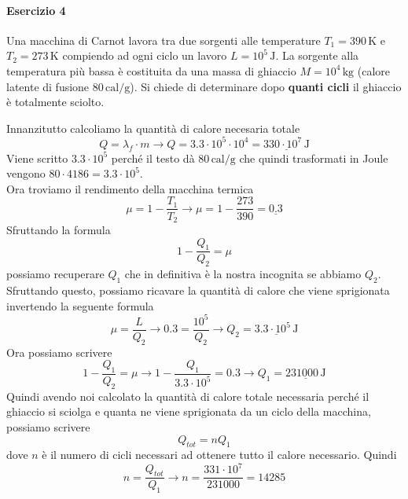 \paragraph{Esercizio 4}
Una macchina di Carnot lavora tra due sorgenti alle temperature $T_1 = 390\,\text{K}$ e 
$T_2 = 273\,\text{K}$ compiendo ad ogni ciclo un lavoro $L = 10^5\,\text{J}$. La sorgente alla
temperatura più bassa è costituita da una massa di ghiaccio $M = 10^4\,\text{kg}$ (calore latente
di fusione $80\,\text{cal/g}$). Si chiede di determinare dopo \textbf{quanti cicli} il ghiaccio è 
totalmente sciolto.
\divisor

Innanzitutto calcoliamo la quantità di calore necesaria totale
\begin{equation*}
  Q = \lambda_f\cdot m \rightarrow Q = 3.3\cdot10^5\cdot10^4 = \underline{330\cdot10^7\,\text{J}} 
\end{equation*}
Viene scritto $3.3\cdot10^5$ perché il testo dà $80\,\text{cal/g}$ che quindi trasformati in Joule
vengono $80\cdot4186 = 3.3\cdot10^5$.\\
Ora troviamo il rendimento della macchina termica
\begin{equation*}
  \mu = 1-\frac{T_1}{T_2} \rightarrow \mu = 1-\frac{273}{390}=\underline{0.3} 
\end{equation*}
Sfruttando la formula
\begin{equation*}
  1-\frac{Q_1}{Q_2} = \mu
\end{equation*}
possiamo recuperare $Q_1$ che in definitiva è la nostra incognita se abbiamo $Q_2$.\\
Sfruttando questo, possiamo ricavare la quantità di calore che viene sprigionata invertendo
la seguente formula
\begin{equation*}
  \mu = \frac{L}{Q_2} \rightarrow 0.3 = \frac{10^5}{Q_2} \rightarrow 
  Q_2 = \underline{3.3\cdot10^5\,\text{J}} 
\end{equation*}
Ora possiamo scrivere
\begin{equation*}
  1-\frac{Q_1}{Q_2} = \mu \rightarrow 1-\frac{Q_1}{3.3\cdot10^5}=0.3 \rightarrow Q_1 =
  \underline{231000\,\text{J}} 
\end{equation*}
Quindi avendo noi calcolato la quantità di calore totale necessaria perché il ghiaccio si sciolga
e quanta ne viene sprigionata da un ciclo della macchina, possiamo scrivere
\begin{equation*}
  Q_{tot} = nQ_1
\end{equation*}
dove $n$ è il numero di cicli necessari ad ottenere tutto il calore necessario. Quindi
\begin{equation*}
  n = \frac{Q_{tot}}{Q_1} \rightarrow n = \frac{331\cdot10^7}{231000} = \boxed{14285}
\end{equation*}

